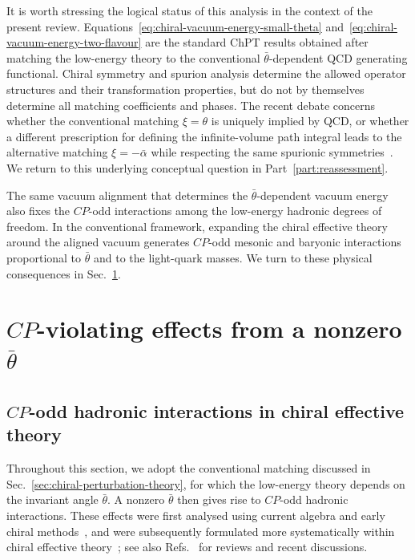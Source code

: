 \documentclass[review]{elsarticle}
\numberwithin{equation}{section}
\numberwithin{table}{section}
\numberwithin{figure}{section}
\begin{document}
It is worth stressing the logical status of this analysis in the context of the present review. Equations~\eqref{eq:chiral-vacuum-energy-small-theta} and~\eqref{eq:chiral-vacuum-energy-two-flavour} are the standard ChPT results obtained after matching the low-energy theory to the conventional $\bar\theta$-dependent QCD generating functional. Chiral symmetry and spurion analysis determine the allowed operator structures and their transformation properties, but do not by themselves determine all matching coefficients and phases. The recent debate concerns whether the conventional matching $\xi=\theta$ is uniquely implied by QCD, or whether a different prescription for defining the infinite-volume path integral leads to the alternative matching $\xi=-\bar\alpha$ while respecting the same spurionic symmetries~\cite{Ai:2020ptm,Ai:2024cnp,Benabou:2025viy,Ai:2025quf}. We return to this underlying conceptual question in Part~\ref{part:reassessment}.

The same vacuum alignment that determines the $\bar\theta$-dependent vacuum energy also fixes the $CP$-odd interactions among the low-energy hadronic degrees of freedom. In the conventional framework, expanding the chiral effective theory around the aligned vacuum generates $CP$-odd mesonic and baryonic interactions proportional to $\bar\theta$ and to the light-quark masses. We turn to these physical consequences in Sec.~\ref{sec:theta-CP-effects}.

\section{\texorpdfstring{$CP$}{CP}-violating effects from a nonzero \texorpdfstring{$\bar\theta$}{theta-bar}}
\label{sec:theta-CP-effects}


\subsection{\texorpdfstring{$CP$}{CP}-odd hadronic interactions in chiral effective theory}
\label{sec:CP-odd-hadronic-interactions}

Throughout this section, we adopt the conventional matching discussed in Sec.~\ref{sec:chiral-perturbation-theory}, for which the low-energy theory depends on the invariant angle $\bar\theta$. A nonzero $\bar\theta$ then gives rise to $CP$-odd hadronic interactions. These effects were first analysed using current algebra and early chiral methods~\cite{Baluni:1978rf,Crewther:1979pi}, and were subsequently formulated more systematically within chiral effective theory~\cite{Pich:1991fq,Mereghetti:2010tp,deVries:2015una}; see also Refs.~\cite{Pospelov:2005pr,Engel:2013lsa,Pospelov:2025vzj,Sannino:2026wgx} for reviews and recent discussions.
\end{document}
